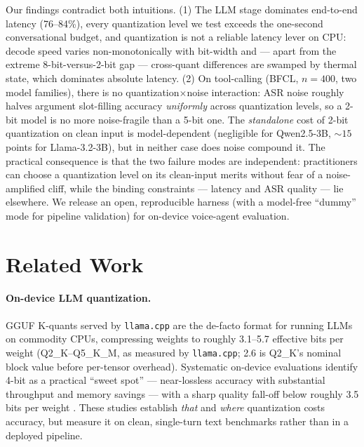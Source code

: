 \documentclass[11pt]{article}
\newcommand{\code}[1]{\texttt{#1}}
\begin{document}
Our findings contradict both intuitions. (1) The LLM stage dominates end-to-end
latency (76--84\%), every quantization level we test exceeds the one-second
conversational budget, and quantization is not a reliable latency lever on CPU: decode
speed varies non-monotonically with bit-width and --- apart from the extreme
8-bit-versus-2-bit gap --- cross-quant differences are swamped by thermal state, which
dominates absolute latency. (2) On tool-calling (BFCL, $n{=}400$, two model families),
there is no quantization$\times$noise interaction: ASR noise roughly halves argument
slot-filling accuracy \emph{uniformly} across quantization levels, so a 2-bit model is
no more noise-fragile than a 5-bit one. The \emph{standalone} cost of 2-bit
quantization on clean input is model-dependent (negligible for Qwen2.5-3B, ${\sim}15$
points for Llama-3.2-3B), but in neither case does noise compound it. The practical
consequence is that the two failure modes are independent: practitioners can choose a
quantization level on its clean-input merits without fear of a noise-amplified cliff,
while the binding constraints --- latency and ASR quality --- lie elsewhere. We
release an open, reproducible harness (with a model-free ``dummy'' mode for pipeline
validation) for on-device voice-agent evaluation.

\section{Related Work}
\paragraph{On-device LLM quantization.} GGUF K-quants served by \code{llama.cpp} are
the de-facto format for running LLMs on commodity CPUs, compressing weights to roughly
3.1--5.7 effective bits per weight (Q2\_K--Q5\_K\_M, as measured by \code{llama.cpp};
2.6 is Q2\_K's nominal block value before per-tensor overhead). Systematic on-device
evaluations identify 4-bit as a practical ``sweet spot'' --- near-lossless accuracy
with substantial throughput and memory savings \citep{song2025,kurt2026} --- with a
sharp quality fall-off below roughly 3.5 bits per weight \citep{song2025}. These
studies establish \emph{that} and \emph{where} quantization costs accuracy, but measure
it on clean, single-turn text benchmarks rather than in a deployed pipeline.
\end{document}
